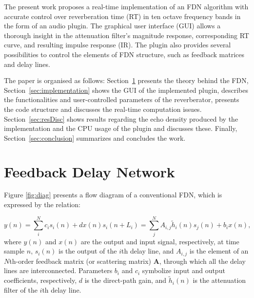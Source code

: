 \documentclass[twoside,a4paper]{article}
\newcommand{\silvin}[1]{\textcolor{ForestGreen}{#1}}
\begin{document}




The present work proposes a real-time implementation of an FDN algorithm with accurate control over reverberation time (RT) in ten octave frequency bands in the form of an audio plugin. The graphical user interface (GUI) allows a thorough insight in the attenuation filter's magnitude response, corresponding RT curve, and resulting impulse response (IR). The plugin also provides several possibilities to control the elements of FDN structure, such as feedback matrices and delay lines.%

The paper is organised as follows: Section~\ref{sec:FDN} presents the theory behind the FDN, Section~\ref{sec:implementation} shows the GUI of the implemented plugin, describes the functionalities and user-controlled parameters of the reverberator, presents the code structure and discusses the real-time computation issues. Section~\ref{sec:resDisc} shows results regarding the echo density produced by the implementation and the CPU usage of the plugin and discusses these. Finally, Section~\ref{sec:conclusion} summarizes and concludes the work.

\section{Feedback Delay Network}\label{sec:FDN}
Figure \ref{fig:diag} presents a flow diagram of a conventional FDN, which is expressed by the relation:

\begin{subequations} \label{1}
\begin{equation}\label{1a}
y(n) =  \sum_i^N c_i s_i(n) + d x(n) 
\end{equation}
\begin{equation}\label{1b}
s_i(n + L_i) = \sum_j^N A_{i,j} \widetilde{h}_{i}(n) s_j(n) + b_i x(n),
\end{equation}
\end{subequations}
%
where $y(n)$ and $x(n)$ are the output and input signal, respectively, at time sample $n$, $s_i(n)$ is the output of the $i$th delay line, and $A_{i,j}$ is the element of an $N$th-order feedback matrix (or scattering matrix) $\textbf{A}$, through which all the delay lines are interconnected. Parameters $b_i$ and $c_i$ symbolize input and output coefficients, respectively, $d$ is the direct-path gain, and $\widetilde{h}_{i}(n)$ is the attenuation filter of the $i$th delay line.
\end{document}
